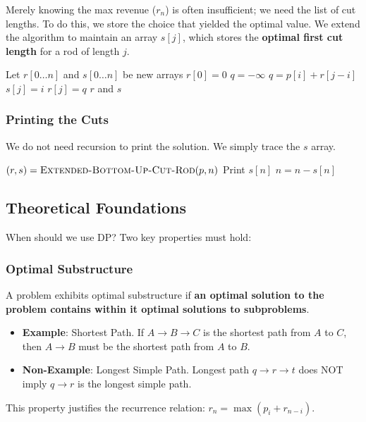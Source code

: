 \documentclass[12pt]{article}
\theoremstyle{blueplain}
\theoremstyle{bluedef}
\theoremstyle{blueremark}
\begin{document}
Merely knowing the max revenue ($r_n$) is often insufficient; we need the list of cut lengths. To do this, we store the choice that yielded the optimal value.
We extend the algorithm to maintain an array $s[j]$, which stores the \textbf{optimal first cut length} for a rod of length $j$.

\begin{algorithm}
    \caption{Extended-Bottom-Up-Cut-Rod(p, n)}\label{alg:extendedCutRod}
    \begin{algorithmic}[1]
        \State Let $r[0 \dots n]$ and $s[0 \dots n]$ be new arrays
        \State $r[0] = 0$
        \State $q = -\infty$
        \State $q = p[i] + r[j-i]$
        \State $s[j] = i$ 
        \EndIf
        \EndFor
        \State $r[j] = q$
        \EndFor
        \Return $r$ and $s$
        \EndProcedure
    \end{algorithmic}
\end{algorithm}

\subsubsection{Printing the Cuts}
We do not need recursion to print the solution. We simply trace the $s$ array.

\begin{algorithm}
    \caption{Print-Cut-Rod-Solution(p, n)}
    \begin{algorithmic}[1]
        \State $(r, s) = \Call{Extended-Bottom-Up-Cut-Rod}{p, n}$
        \State Print $s[n]$ 
        \State $n = n - s[n]$ 
        \EndWhile
        \EndProcedure
    \end{algorithmic}
\end{algorithm}

\subsection{Theoretical Foundations}

When should we use DP? Two key properties must hold:

\subsubsection{Optimal Substructure}
A problem exhibits optimal substructure if \textbf{an optimal solution to the problem contains within it optimal solutions to subproblems}.
\begin{itemize}
    \item \textbf{Example}: Shortest Path. If $A \to B \to C$ is the shortest path from $A$ to $C$, then $A \to B$ must be the shortest path from $A$ to $B$.
    \item \textbf{Non-Example}: Longest Simple Path. Longest path $q \to r \to t$ does NOT imply $q \to r$ is the longest simple path.
\end{itemize}
This property justifies the recurrence relation: $r_n = \max(p_i + r_{n-i})$.
\end{document}
